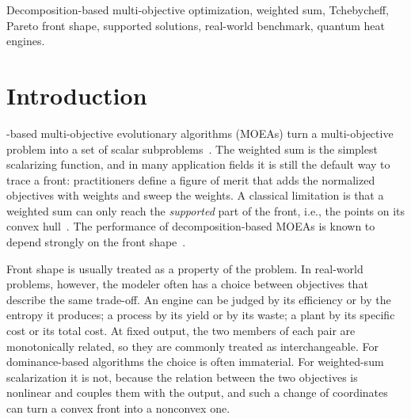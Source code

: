 \documentclass[journal]{IEEEtran}
\theoremstyle{remark}
\begin{document}
\begin{IEEEkeywords}
Decomposition-based multi-objective optimization, weighted sum, Tchebycheff, Pareto front shape,
supported solutions, real-world benchmark, quantum heat engines.
\end{IEEEkeywords}

\section{Introduction}

-based multi-objective evolutionary algorithms (MOEAs) turn a
multi-objective problem into a set of scalar subproblems~\cite{ZhangLi2007,Trivedi2017}. The
weighted sum is the simplest scalarizing function, and in many application fields it is still the
default way to trace a front: practitioners define a figure of merit that adds the normalized
objectives with weights and sweep the weights. A classical limitation is that a weighted sum can
only reach the \emph{supported} part of the front, i.e., the points on its convex
hull~\cite{DasDennis1997,Ehrgott2005,Marler2004}. The performance of decomposition-based MOEAs is
known to depend strongly on the front shape~\cite{Ishibuchi2017}.

Front shape is usually treated as a property of the problem. In real-world problems, however, the
modeler often has a choice between objectives that describe the same trade-off. An engine can be
judged by its efficiency or by the entropy it produces; a process by its yield or by its waste; a
plant by its specific cost or its total cost. At fixed output, the two members of each pair are
monotonically related, so they are commonly treated as interchangeable. For dominance-based
algorithms the choice is often immaterial. For weighted-sum scalarization it is not, because the
relation between the two objectives is nonlinear and couples them with the output, and such a
change of coordinates can turn a convex front into a nonconvex one.
\end{document}
